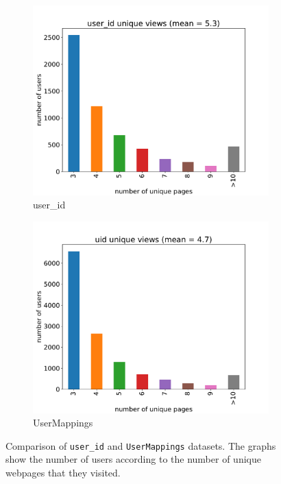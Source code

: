 \begin{figure}[H]
\centering
\begin{subfigure}{.5\textwidth}
  \centering
  \includegraphics[scale=0.34]{obrazky-figures/user_3_pages.pdf}
  \caption{user\_id}
  \label{fig:unique_pages_comparison_user_id}
\end{subfigure}%
\begin{subfigure}{.5\textwidth}
  \centering
  \includegraphics[scale=0.34]{obrazky-figures/uid_3_pages.pdf}
  \caption{UserMappings}
  \label{fig:unique_pages_comparison_uid}
\end{subfigure}
\caption{Comparison of \texttt{user\_id} and \texttt{UserMappings} datasets. The graphs show the number of users according to the number of unique webpages that they visited.}
\label{fig:unique_pages_comparison}
\end{figure}

